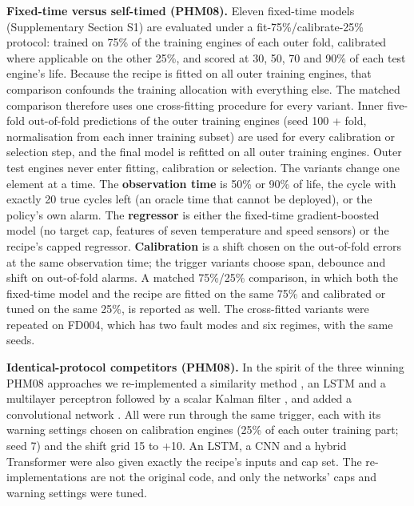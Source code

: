 \documentclass[a4paper,fleqn,doubleblind]{cas-dc}
\begin{document}
\textbf{Fixed-time versus self-timed (PHM08).} Eleven fixed-time models (Supplementary Section S1) are evaluated under a fit-75\%/calibrate-25\% protocol: trained on 75\% of the training engines of each outer fold, calibrated where applicable on the other 25\%, and scored at 30, 50, 70 and 90\% of each test engine's life. Because the recipe is fitted on all outer training engines, that comparison confounds the training allocation with everything else. The matched comparison therefore uses one cross-fitting procedure for every variant. Inner five-fold out-of-fold predictions of the outer training engines (seed 100 + fold, normalisation from each inner training subset) are used for every calibration or selection step, and the final model is refitted on all outer training engines. Outer test engines never enter fitting, calibration or selection. The variants change one element at a time. The \textbf{observation time} is 50\% or 90\% of life, the cycle with exactly 20 true cycles left (an oracle time that cannot be deployed), or the policy's own alarm. The \textbf{regressor} is either the fixed-time gradient-boosted model (no target cap, features of seven temperature and speed sensors) or the recipe's capped regressor. \textbf{Calibration} is a shift chosen on the out-of-fold errors at the same observation time; the trigger variants choose span, debounce and shift on out-of-fold alarms. A matched 75\%/25\% comparison, in which both the fixed-time model and the recipe are fitted on the same 75\% and calibrated or tuned on the same 25\%, is reported as well. The cross-fitted variants were repeated on FD004, which has two fault modes and six regimes, with the same seeds.

\textbf{Identical-protocol competitors (PHM08).} In the spirit of the three winning PHM08 approaches we re-implemented a similarity method \cite{wang2008}, an LSTM \cite{heimes2008,zheng2017} and a multilayer perceptron followed by a scalar Kalman filter \cite{peel2008}, and added a convolutional network \cite{li2018}. All were run through the same trigger, each with its warning settings chosen on calibration engines (25\% of each outer training part; seed 7) and the shift grid \textminus{}15 to +10. An LSTM, a CNN and a hybrid Transformer were also given exactly the recipe's inputs and cap set. The re-implementations are not the original code, and only the networks' caps and warning settings were tuned.
\end{document}
